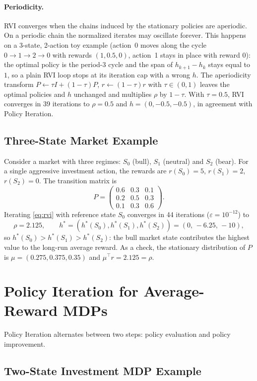 \documentclass[11pt,a4paper]{article}
\begin{document}
\paragraph{Periodicity.} RVI converges when the chains induced by the stationary policies are aperiodic. On a periodic chain the normalized iterates may oscillate forever. This happens on a 3-state, 2-action toy example (action~0 moves along the cycle $0\to1\to2\to0$ with rewards $(1,0.5,0)$, action~1 stays in place with reward $0$): the optimal policy is the period-3 cycle and the span of $h_{k+1}-h_k$ stays equal to $1$, so a plain RVI loop stops at its iteration cap with a wrong $h$. The aperiodicity transform $P\leftarrow\tau I+(1-\tau)P$, $r\leftarrow(1-\tau)r$ with $\tau\in(0,1)$ leaves the optimal policies and $h$ unchanged and multiplies $\rho$ by $1-\tau$. With $\tau=0.5$, RVI converges in 39 iterations to $\rho=0.5$ and $h=(0,-0.5,-0.5)$, in agreement with Policy Iteration.

\subsection{Three-State Market Example}

Consider a market with three regimes: $S_0$ (bull), $S_1$ (neutral) and $S_2$ (bear). For a single aggressive investment action, the rewards are $r(S_0)=5$, $r(S_1)=2$, $r(S_2)=0$. The transition matrix is
\[
  P=\begin{pmatrix}0.6&0.3&0.1\\0.2&0.5&0.3\\0.1&0.3&0.6\end{pmatrix}.
\]
Iterating \eqref{eq:rvi} with reference state $S_0$ converges in 44 iterations ($\varepsilon=10^{-12}$) to
\[
  \rho=2.125,\qquad h^*=(h^*(S_0),h^*(S_1),h^*(S_2))=(0,\,-6.25,\,-10),
\]
so $h^*(S_0)>h^*(S_1)>h^*(S_2)$: the bull market state contributes the highest value to the long-run average reward. As a check, the stationary distribution of $P$ is $\mu=(0.275,0.375,0.35)$ and $\mu^\top r=2.125=\rho$.

\section{Policy Iteration for Average-Reward MDPs}

Policy Iteration alternates between two steps: policy evaluation and policy improvement.

\subsection{Two-State Investment MDP Example}
\end{document}
